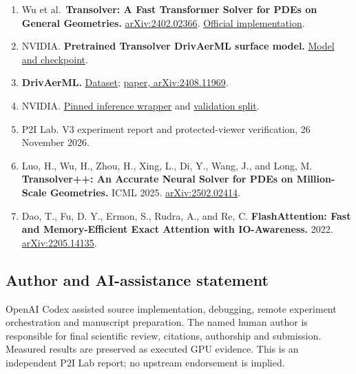 \documentclass[
  10pt,
]{article}
\begin{document}
\begin{enumerate}
\def\labelenumi{\arabic{enumi}.}
\item
  Wu et al.~\textbf{Transolver: A Fast Transformer Solver for PDEs on
  General Geometries.}
  \href{https://arxiv.org/abs/2402.02366}{arXiv:2402.02366}.
  \href{https://github.com/thuml/Transolver}{Official implementation}.
\item
  NVIDIA. \textbf{Pretrained Transolver DrivAerML surface model.}
  \href{https://huggingface.co/nvidia/transolver_drivaerml}{Model and
  checkpoint}.
\item
  \textbf{DrivAerML.}
  \href{https://huggingface.co/datasets/neashton/drivaerml}{Dataset};
  \href{https://arxiv.org/abs/2408.11969}{paper, arXiv:2408.11969}.
\item
  NVIDIA.
  \href{https://github.com/NVIDIA/physicsnemo-cfd/blob/06846c9fbc08b8e82551841897b5294f7e5ef82d/physicsnemo/cfd/evaluation/models/wrappers/transolver/wrapper.py}{Pinned
  inference wrapper} and
  \href{https://github.com/NVIDIA/physicsnemo-cfd/blob/06846c9fbc08b8e82551841897b5294f7e5ef82d/workflows/benchmarking/drivaer_ml_files/validation.csv}{validation
  split}.
\item
  P2I Lab. V3 experiment report and protected-viewer verification, 26
  November 2026.
\item
  Luo, H., Wu, H., Zhou, H., Xing, L., Di, Y., Wang, J., and Long, M.
  \textbf{Transolver++: An Accurate Neural Solver for PDEs on
  Million-Scale Geometries.} ICML 2025.
  \href{https://arxiv.org/abs/2502.02414}{arXiv:2502.02414}.
\item
  Dao, T., Fu, D. Y., Ermon, S., Rudra, A., and Re, C.
  \textbf{FlashAttention: Fast and Memory-Efficient Exact Attention with
  IO-Awareness.} 2022.
  \href{https://arxiv.org/abs/2205.14135}{arXiv:2205.14135}.
\end{enumerate}

\subsection{Author and AI-assistance
statement}\label{author-and-ai-assistance-statement}

OpenAI Codex assisted source implementation, debugging, remote
experiment orchestration and manuscript preparation. The named human
author is responsible for final scientific review, citations, authorship
and submission. Measured results are preserved as executed GPU evidence.
This is an independent P2I Lab report; no upstream endorsement is
implied.
\end{document}
